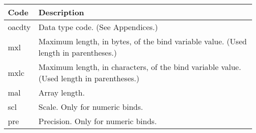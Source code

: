 \begin{longtable}[]{@{}l|l@{}}
\toprule
\begin{minipage}[b]{0.14\columnwidth}\raggedright\strut
Code\strut
\end{minipage} & \begin{minipage}[b]{0.65\columnwidth}\raggedright\strut
Description\strut
\end{minipage}\tabularnewline
\midrule
\endhead
\begin{minipage}[t]{0.14\columnwidth}\raggedright\strut
oacdty\strut
\end{minipage} & \begin{minipage}[t]{0.65\columnwidth}\raggedright\strut
Data type code. (See Appendices.)\strut
\end{minipage}\tabularnewline
\begin{minipage}[t]{0.14\columnwidth}\raggedright\strut
mxl\strut
\end{minipage} & \begin{minipage}[t]{0.65\columnwidth}\raggedright\strut
Maximum length, in bytes, of the bind variable value. (Used length in
parentheses.)\strut
\end{minipage}\tabularnewline
\begin{minipage}[t]{0.14\columnwidth}\raggedright\strut
mxlc\strut
\end{minipage} & \begin{minipage}[t]{0.65\columnwidth}\raggedright\strut
Maximum length, in characters, of the bind variable value. (Used length
in parentheses.)\strut
\end{minipage}\tabularnewline
\begin{minipage}[t]{0.14\columnwidth}\raggedright\strut
mal\strut
\end{minipage} & \begin{minipage}[t]{0.65\columnwidth}\raggedright\strut
Array length.\strut
\end{minipage}\tabularnewline
\begin{minipage}[t]{0.14\columnwidth}\raggedright\strut
scl\strut
\end{minipage} & \begin{minipage}[t]{0.65\columnwidth}\raggedright\strut
Scale. Only for numeric binds.\strut
\end{minipage}\tabularnewline
\begin{minipage}[t]{0.14\columnwidth}\raggedright\strut
pre\strut
\end{minipage} & \begin{minipage}[t]{0.65\columnwidth}\raggedright\strut
Precision. Only for numeric binds.\strut

\end{minipage}
\end{longtable}
